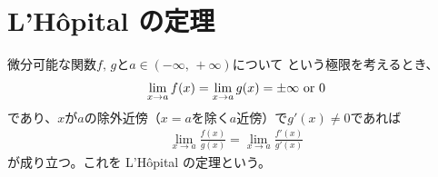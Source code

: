 \newpage
\section{L'H\^{o}pital の定理}

微分可能な関数$f,\,g$と$a\in (-\infty,\,+\infty)$について
という極限を考えるとき、
\begin{gather}
  \lim_{x\to a} f(x) = \lim_{x\to a} g(x) = \pm \infty ~\rm{or}~ 0
\end{gather}
であり、$x$が$a$の除外近傍（$x=a$を除く$a$近傍）で$g'(x)\neq 0$であれば
\begin{gather}
  \lim_{x\to a}\frac{f(x)}{g(x)} = \lim_{x\to a}\frac{f'(x)}{g'(x)}
\end{gather}
が成り立つ。これを L'H\^{o}pital の定理という。
